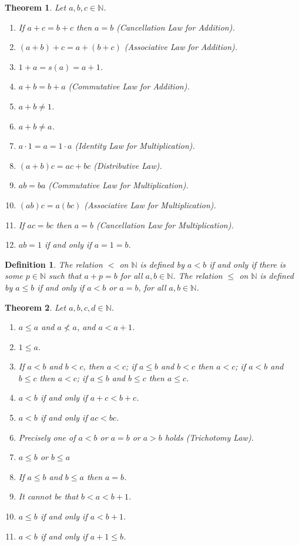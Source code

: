 \documentclass{article}
\newtheorem{theorem}{Theorem}
\newtheorem*{definition}{Definition}
\newcommand{\N}{\mathbb{N}}
\begin{document}
\begin{theorem}
	Let $a, b, c \in \N$.
	\begin{enumerate}
		\item If $a + c = b + c$ then $a = b$ (Cancellation Law for Addition).
		\item $(a + b) + c = a + (b + c)$ (Associative Law for Addition).
		\item $1 + a = s(a) = a + 1$.
		\item $a + b = b + a$ (Commutative Law for Addition).
		\item $a + b \ne 1$.
		\item $a + b \ne a$.
		\item $a \cdot 1 = a = 1\cdot a$ (Identity Law for Multiplication).
		\item $(a + b)c = ac + bc$ (Distributive Law).
		\item $ab = ba$ (Commutative Law for Multiplication).
		\item $(ab)c = a(bc)$ (Associative Law for Multiplication).
		\item If $ac = bc$ then $a = b$ (Cancellation Law for Multiplication).
		\item $ab = 1$ if and only if $a = 1 = b$.
	\end{enumerate}
\end{theorem}

\begin{definition}
	The relation $<$ on $\N$ is defined by $a < b$ if and only if there is some $p \in \N$ such that $a + p = b$ for all $a,b \in \N$. The relation $\le$ on $\N$ is defined by $a \le b$ if and only if $a < b$ or $a = b$, for all $a, b \in \N$.
\end{definition}

\begin{theorem}
	Let $a,b,c,d \in \N$.
	\begin{enumerate}
		\item $a \le a$ and $a \nless a$, and $a < a + 1$.
		\item $1 \le a$.
		\item If $a < b$ and $b < c$, then $a < c$; if $a \le b$ and $b < c$ then $a < c$; if $a < b$ and $b \le c$ then $a < c$; if $a \le b$ and $b \le c$ then $a \le c$.
		\item $a < b$ if and only if $a + c < b + c$.
		\item $a < b$ if and only if $ac < bc$.
		\item Precisely one of $a < b$ or $a = b$ or $a > b$ holds (Trichotomy Law).
		\item $a \le b$ or $b \le a$
		\item If $a \le b$ and $b \le a$ then $a = b$.
		\item It cannot be that $b < a < b + 1$.
		\item $a \le b$ if and only if $a < b + 1$.
		\item $a < b$ if and only if $a + 1 \le b$.
	\end{enumerate}
\end{theorem}
\end{document}

